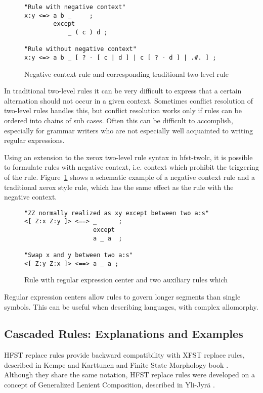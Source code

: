 \documentclass{llncs}
\begin{document}
\begin{figure}
\begin{verbatim}
"Rule with negative context"
x:y <=> a b _     ;
        except
            _ ( c ) d ;

"Rule without negative context"
x:y <=> a b _ [ ? - [ c | d ] | c [ ? - d ] | .#. ] ;
\end{verbatim}
\caption{Negative context rule and corresponding traditional two-level
  rule}\label{negative-context-rule}
\end{figure}

In traditional two-level rules it can be very difficult to express
that a certain alternation should not occur in a given
context. Sometimes conflict resolution of two-level rules handles
this, but conflict resolution works only if rules can be ordered into
chains of sub cases. Often this can be difficult to accomplish,
especially for grammar writers who are not especially well acquainted
to writing regular expressions.

Using an extension to the xerox two-level rule syntax in hfst-twolc,
it is possible to formulate rules with negative context, i.e. context
which prohibit the triggering of the
rule. Figure~\ref{negative-context-rule} shows a schematic example of
a negative context rule and a traditional xerox style rule, which has
the same effect as the rule with the negative context.

\begin{figure}
\begin{verbatim}
"ZZ normally realized as xy except between two a:s"
<[ Z:x Z:y ]> <==> _      ;
                   except
                   a _ a  ;

"Swap x and y between two a:s"
<[ Z:y Z:x ]> <==> a _ a ; 
\end{verbatim}
\caption{Rule with regular expression center and two auxiliary rules which}
\end{figure}

Regular expression centers allow rules to govern longer segments than
single symbols. This can be useful when describing languages, with
complex allomorphy.

\subsection{Cascaded Rules: Explanations and Examples}
HFST replace rules provide backward compatibility with XFST replace rules, described in Kempe and Karttunen \cite{Kempe96parallelreplacement} and Finite State Morphology book \cite{beesley/2003}. Although they share the same notation, HFST replace rules were developed on a concept of Generalized Lenient Composition, described in Yli-Jyr\"{a} \cite{YliJyra/2008b}. 
\end{document}
